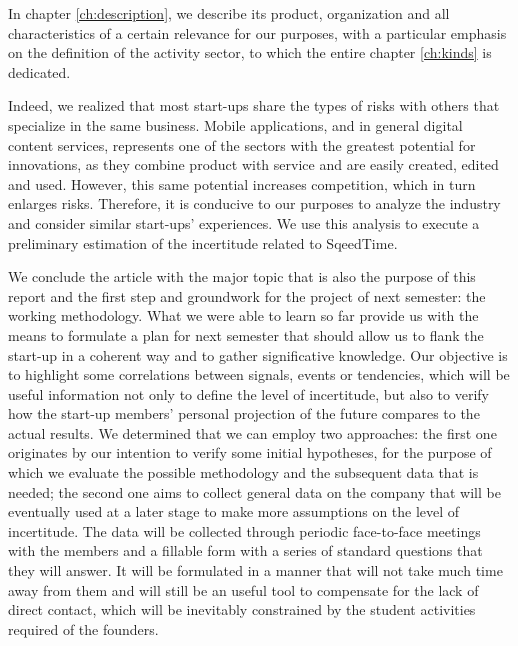 \documentclass[twoside]{report}
\begin{document}
	In chapter \ref{ch:description}, we describe its product, organization and all characteristics of a certain relevance for our purposes, with a particular emphasis on the definition of the activity sector, to which the entire chapter \ref{ch:kinds} is dedicated. 
	
	Indeed, we realized that most start-ups share the types of risks with others that specialize in the same business. Mobile applications, and in general digital content services, represents one of the sectors with the greatest potential for innovations, as they combine product with service and are easily created, edited and used. However, this same potential increases competition, which in turn enlarges risks. Therefore, it is conducive to our purposes to analyze the industry and consider similar start-ups’ experiences. We use this analysis to execute a preliminary estimation of the incertitude related to SqeedTime. 
	
	We conclude the article with the major topic that is also the purpose of this report and the first step and groundwork for the project of next semester: the working methodology. What we were able to learn so far provide us with the means to formulate a plan for next semester that should allow us to flank the start-up in a coherent way and to gather significative knowledge. Our objective is to highlight some correlations between signals, events or tendencies, which will be useful information not only to define the level of incertitude, but also to verify how the start-up members’ personal projection of the future compares to the actual results. We determined that we can employ two approaches: the first one originates by our intention to verify some initial hypotheses, for the purpose of which we evaluate the possible methodology and the subsequent data that is needed; the second one aims to collect general data on the company that will be eventually used at a later stage to make more assumptions on the level of incertitude. The data will be collected through periodic face-to-face meetings with the members and a fillable form with a series of standard questions that they will answer. It will be formulated in a manner that will not take much time away from them and will still be an useful tool to compensate for the lack of direct contact, which will be inevitably constrained by the student activities required of the founders.
\end{document}
